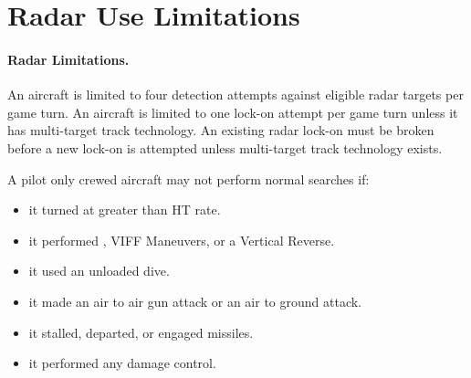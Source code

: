 
\section{Radar Use Limitations}

\paragraph{Radar Limitations.} An aircraft is limited to four detection attempts against eligible radar targets per game turn. An aircraft is limited to one lock-on attempt per game turn unless it has multi-target track technology. An existing radar lock-on must be broken before a new lock-on is attempted unless multi-target track technology exists.

A pilot only crewed aircraft may not perform normal searches if:

\begin{itemize}

    \item it turned at greater than HT rate.

    \item it performed , VIFF Maneuvers, or a Vertical Reverse.

    \item it used an unloaded dive.

    \item it made an air to air gun  attack or an air to ground attack.

    \item it stalled, departed, or engaged missiles.


    \item it performed any damage control.

    
\end{itemize}

